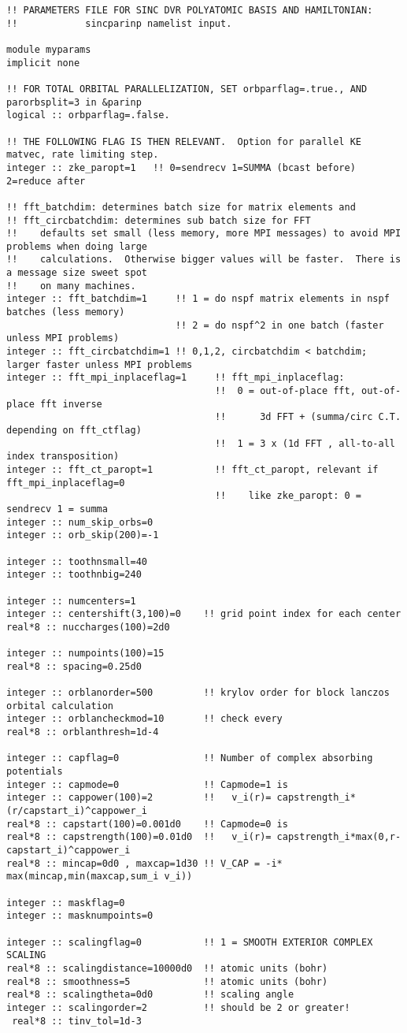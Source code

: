 \begin{verbatim}
!! PARAMETERS FILE FOR SINC DVR POLYATOMIC BASIS AND HAMILTONIAN:
!!            sincparinp namelist input.

module myparams
implicit none

!! FOR TOTAL ORBITAL PARALLELIZATION, SET orbparflag=.true., AND parorbsplit=3 in &parinp
logical :: orbparflag=.false.

!! THE FOLLOWING FLAG IS THEN RELEVANT.  Option for parallel KE matvec, rate limiting step.
integer :: zke_paropt=1   !! 0=sendrecv 1=SUMMA (bcast before) 2=reduce after

!! fft_batchdim: determines batch size for matrix elements and 
!! fft_circbatchdim: determines sub batch size for FFT 
!!    defaults set small (less memory, more MPI messages) to avoid MPI problems when doing large 
!!    calculations.  Otherwise bigger values will be faster.  There is a message size sweet spot
!!    on many machines.
integer :: fft_batchdim=1     !! 1 = do nspf matrix elements in nspf batches (less memory)
                              !! 2 = do nspf^2 in one batch (faster unless MPI problems)
integer :: fft_circbatchdim=1 !! 0,1,2, circbatchdim < batchdim; larger faster unless MPI problems
integer :: fft_mpi_inplaceflag=1     !! fft_mpi_inplaceflag:
                                     !!  0 = out-of-place fft, out-of-place fft inverse
                                     !!      3d FFT + (summa/circ C.T. depending on fft_ctflag)
                                     !!  1 = 3 x (1d FFT , all-to-all index transposition)
integer :: fft_ct_paropt=1           !! fft_ct_paropt, relevant if fft_mpi_inplaceflag=0
                                     !!    like zke_paropt: 0 = sendrecv 1 = summa
integer :: num_skip_orbs=0
integer :: orb_skip(200)=-1

integer :: toothnsmall=40
integer :: toothnbig=240

integer :: numcenters=1
integer :: centershift(3,100)=0    !! grid point index for each center
real*8 :: nuccharges(100)=2d0

integer :: numpoints(100)=15
real*8 :: spacing=0.25d0

integer :: orblanorder=500         !! krylov order for block lanczos orbital calculation
integer :: orblancheckmod=10       !! check every
real*8 :: orblanthresh=1d-4

integer :: capflag=0               !! Number of complex absorbing potentials
integer :: capmode=0               !! Capmode=1 is 
integer :: cappower(100)=2         !!   v_i(r)= capstrength_i*(r/capstart_i)^cappower_i
real*8 :: capstart(100)=0.001d0    !! Capmode=0 is    
real*8 :: capstrength(100)=0.01d0  !!   v_i(r)= capstrength_i*max(0,r-capstart_i)^cappower_i
real*8 :: mincap=0d0 , maxcap=1d30 !! V_CAP = -i* max(mincap,min(maxcap,sum_i v_i))

integer :: maskflag=0
integer :: masknumpoints=0

integer :: scalingflag=0           !! 1 = SMOOTH EXTERIOR COMPLEX SCALING
real*8 :: scalingdistance=10000d0  !! atomic units (bohr)
real*8 :: smoothness=5             !! atomic units (bohr)
real*8 :: scalingtheta=0d0         !! scaling angle
integer :: scalingorder=2          !! should be 2 or greater!
 real*8 :: tinv_tol=1d-3
\end{verbatim}
